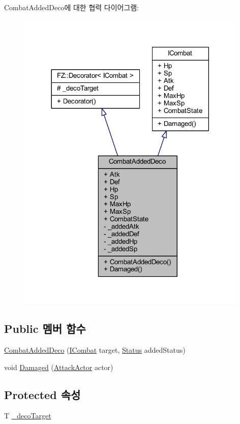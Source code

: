Combat\+Added\+Deco에 대한 협력 다이어그램\+:
\nopagebreak
\begin{figure}[H]
\begin{center}
\leavevmode
\includegraphics[width=312pt]{class_combat_added_deco__coll__graph}
\end{center}
\end{figure}
\subsection*{Public 멤버 함수}
\begin{DoxyCompactItemize}
\item 
\hyperlink{class_combat_added_deco_a18e349f5ae6041f6b2d1d1844b59987a}{Combat\+Added\+Deco} (\hyperlink{interface_i_combat}{I\+Combat} target, \hyperlink{struct_status}{Status} added\+Status)
\item 
void \hyperlink{class_combat_added_deco_a3f1bc69d50b10571339d651eaa093a43}{Damaged} (\hyperlink{class_attack_actor}{Attack\+Actor} actor)
\end{DoxyCompactItemize}
\subsection*{Protected 속성}
\begin{DoxyCompactItemize}
\item 
T \hyperlink{class_f_z_1_1_decorator_adce2c6d288dcfa08b899f3e233190210}{\+\_\+deco\+Target}
\end{DoxyCompactItemize}
